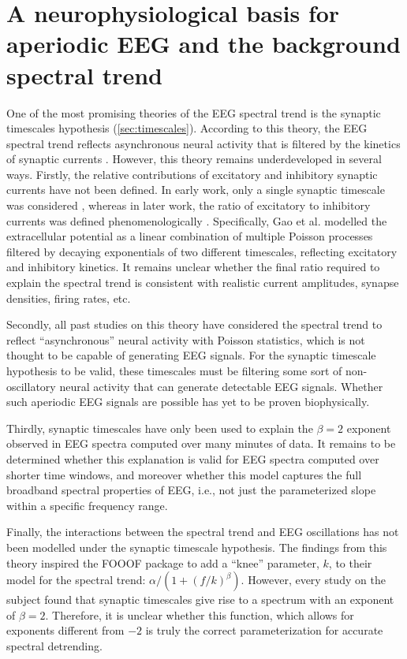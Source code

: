 \chapter{A neurophysiological basis for aperiodic EEG and the background spectral trend} \label{sec:natcomms}

One of the most promising theories of the EEG spectral trend is the synaptic timescales hypothesis (\autoref{sec:timescales}). According to this theory, the EEG spectral trend reflects asynchronous neural activity that is filtered by the kinetics of synaptic currents \cite{Bedard2006,Miller2009, Gao2017}. However, this theory remains underdeveloped in several ways. Firstly, the relative contributions of excitatory and inhibitory synaptic currents have not been defined. In early work, only a single synaptic timescale was considered \cite{Bedard2006,Miller2009}, whereas in later work, the ratio of excitatory to inhibitory currents was defined phenomenologically \cite{Gao2017}. Specifically, Gao et al. \cite{Gao2017} modelled the extracellular potential as a linear combination of multiple Poisson processes filtered by decaying exponentials of two different timescales, reflecting excitatory and inhibitory kinetics. It remains unclear whether the final ratio required to explain the spectral trend is consistent with realistic current amplitudes, synapse densities, firing rates, etc.

Secondly, all past studies on this theory have considered the spectral trend to reflect ``asynchronous'' neural activity with Poisson statistics, which is not thought to be capable of generating EEG signals. For the synaptic timescale hypothesis to be valid, these timescales must be filtering some sort of non-oscillatory neural activity that can generate detectable EEG signals. Whether such aperiodic EEG signals are possible has yet to be proven biophysically.

Thirdly, synaptic timescales have only been used to explain the $\beta=2$ exponent observed in EEG spectra computed over many minutes of data. It remains to be determined whether this explanation is valid for EEG spectra computed over shorter time windows, and moreover whether this model captures the full broadband spectral properties of EEG, i.e., not just the parameterized slope within a specific frequency range. 

Finally, the interactions between the spectral trend and EEG oscillations has not been modelled under the synaptic timescale hypothesis. The findings from this theory inspired the FOOOF package to add a ``knee'' parameter, $k$, to their model for the spectral trend: $\alpha/(1+(f/k)^\beta)$. However, every study on the subject found that synaptic timescales give rise to a spectrum with an exponent of $\beta=2$. Therefore, it is unclear whether this function, which allows for exponents different from $-2$ is truly the correct parameterization for accurate spectral detrending. 


